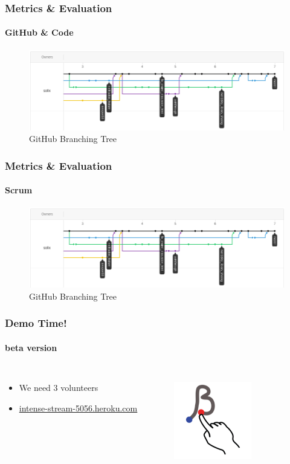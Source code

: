 \documentclass{beamer}
\begin{document}
\begin{frame}
\frametitle{Metrics \& Evaluation}
\framesubtitle{GitHub \& Code}
	\begin{figure}
		\includegraphics[scale=0.3]{./images/github_tree.png}
		\caption{GitHub Branching Tree}
	\end{figure}
\end{frame}

\begin{frame}
\frametitle{Metrics \& Evaluation}
\framesubtitle{Scrum}
	\begin{figure}
		\includegraphics[scale=0.3]{./images/github_tree.png}
		\caption{GitHub Branching Tree}
	\end{figure}
\end{frame}

\begin{frame}
\frametitle{Demo Time!}
\framesubtitle{beta version}


\begin{columns}
\begin{itemize}
	\item We need 3 volunteers 
	\item \url{intense-stream-5056.heroku.com}
	
\end{itemize}
\begin{figure}%
    \centering
    \href{intense-stream-5056.heroku.com}{\includegraphics[scale=0.5]{./images/beta.png}}
\end{figure}		
\end{columns}

\end{frame}
\end{document}
